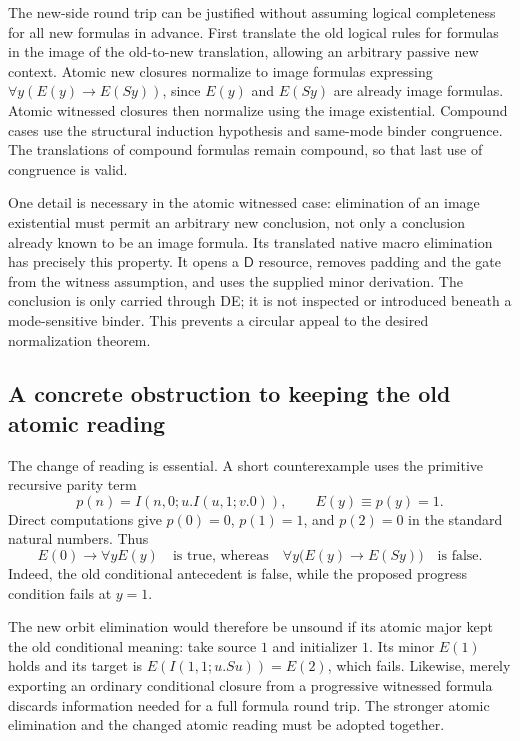 The new-side round trip can be justified without assuming logical
completeness for all new formulas in advance.  First translate the old
logical rules for formulas in the image of the old-to-new translation,
allowing an arbitrary passive new context.  Atomic new closures normalize
to image formulas expressing
$\forall y(E(y)\mathbin{\to}E(Sy))$, since $E(y)$ and $E(Sy)$ are
already image formulas.  Atomic witnessed closures then normalize using
the image existential.  Compound cases use the structural induction
hypothesis and same-mode binder congruence.  The translations of compound
formulas remain compound, so that last use of congruence is valid.

One detail is necessary in the atomic witnessed case: elimination of an
image existential must permit an arbitrary new conclusion, not only a
conclusion already known to be an image formula.  Its translated native
macro elimination has precisely this property.  It opens a $\mathsf D$
resource, removes padding and the gate from the witness assumption, and
uses the supplied minor derivation.  The conclusion is only carried
through DE; it is not inspected or introduced beneath a mode-sensitive
binder.  This prevents a circular appeal to the desired normalization
theorem.

\subsection{A concrete obstruction to keeping the old atomic reading}

The change of reading is essential.  A short counterexample uses the
primitive recursive parity term
\[
 p(n)=I(n,0;u.I(u,1;v.0)),\qquad E(y)\equiv p(y)=1.
\]
Direct computations give $p(0)=0$, $p(1)=1$, and $p(2)=0$ in the
standard natural numbers.  Thus
\[
 E(0)\to\forall y E(y)
 \quad\text{is true, whereas}\quad
 \forall y\bigl(E(y)\to E(Sy)\bigr)
 \quad\text{is false}.
\]
Indeed, the old conditional antecedent is false, while the proposed
progress condition fails at $y=1$.

The new orbit elimination would therefore be unsound if its atomic major
kept the old conditional meaning: take source $1$ and initializer $1$.
Its minor $E(1)$ holds and its target is $E(I(1,1;u.Su))=E(2)$, which
fails.  Likewise, merely exporting an ordinary conditional closure from a
progressive witnessed formula discards information needed for a full
formula round trip.  The stronger atomic elimination and the changed
atomic reading must be adopted together.

